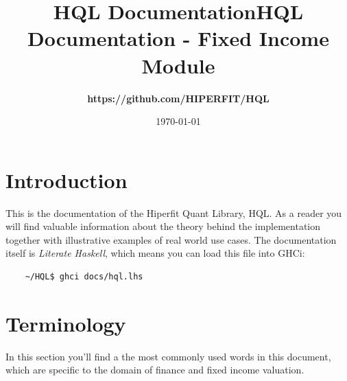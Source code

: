 \documentclass[11pt,a4paper]{article}
\def\Author{
\bf https://github.com/HIPERFIT/HQL
}
\def\Title{\bf HQL Documentation \sf- Fixed Income Module}
\numberwithin{equation}{section}
\begin{document}
\title{HQL Documentation}

\title{\Title}
\author{\Author}
\date{\today}
\maketitle

\tableofcontents

\FrameSep

\newpage


	\section{Introduction}
	This is the documentation of the Hiperfit Quant Library, HQL. As a reader you will
	find valuable information about the theory behind the implementation together with
	illustrative examples of real world use cases. The documentation itself is \textit{Literate Haskell}\cite{LitHaskell},
	which means you can load this file into GHCi:

	\FrameSep
	\begin{lstlisting}
	~/HQL$ ghci docs/hql.lhs
	\end{lstlisting}

	\section{Terminology}
	In this section you'll find a the most commonly used words in this document, which are specific to the domain of finance and fixed income valuation.

\end{document}
